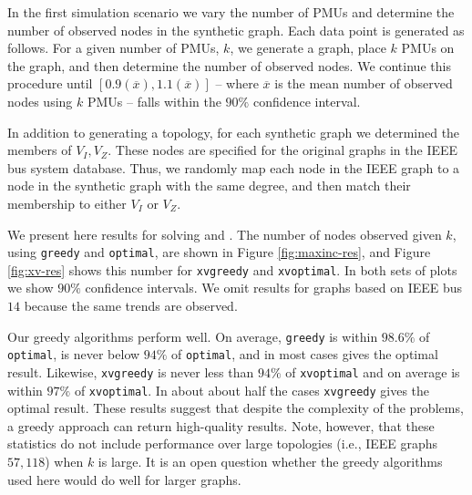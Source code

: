 In the first simulation scenario we vary the number of PMUs and determine the number of observed nodes in the synthetic graph.  %
Each data point is generated as follows. For a given number of PMUs, $k$, we generate a graph, place $k$ PMUs on the graph, and then determine the number of observed nodes. 
We continue this procedure until $[0.9(\overline{x}),1.1(\overline{x})]$ -- where $\overline{x}$ is the mean number of observed nodes using $k$ PMUs -- falls within the $90\%$ confidence interval.

In addition to generating a topology, for each synthetic graph we determined the members of $V_I, V_Z$. These nodes are specified for the original graphs in the IEEE bus system database. Thus, 
we randomly map each node in the IEEE graph to a node in the synthetic graph with the same degree, and then match their membership to either $V_I$ or $V_Z$.

We present here results for solving \maxinc and \xvalparts.  The number of nodes observed given $k$, using {\tt greedy} and {\tt optimal}, are shown in Figure \ref{fig:maxinc-res}, and Figure \ref{fig:xv-res} shows this number for {\tt xvgreedy} and {\tt xvoptimal}. In both sets of plots we show $90\%$
confidence intervals. We omit results for graphs based on IEEE bus $14$ because the same trends are observed.

Our greedy algorithms perform well. On average, {\tt greedy} is within $98.6\%$ of {\tt optimal},
is never below $94\%$ of {\tt optimal}, and in most cases gives the optimal result.
Likewise, {\tt xvgreedy} is never less than $94 \%$ of {\tt xvoptimal} and on average is within $97\%$ of {\tt xvoptimal}. In about about half the cases {\tt xvgreedy} gives the optimal result.
These results suggest that despite the complexity of the problems, a greedy approach can return high-quality results. Note, however, that these statistics do not include performance over
large topologies (i.e., IEEE graphs $57, 118$) when $k$ is large.  It is an open question whether the greedy algorithms used here would do well for larger graphs.



